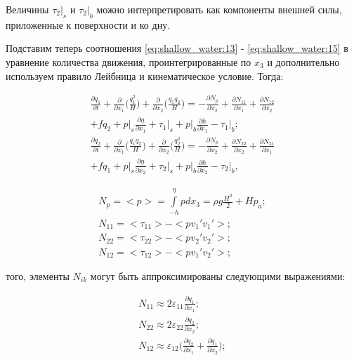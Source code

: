 \documentclass[14pt]{extreport}
\begin{document}
Величины $\tau_2|_s$ и $\tau_2|_b$ можно интерпретировать как компоненты внешней силы, приложенные к поверхности и ко дну.

Подставим теперь соотношения \ref{eq:shallow_water:13} - \ref{eq:shallow_water:15} в уравнение количества движения, проинтегрированные по $x_3$ и дополнительно используем правило Лейбница и кинематическое условие. Тогда:

\begin{equation}\label{eq:shallow_water:17}
\begin{aligned}
\frac{\partial q_1}{\partial t} + \frac{\partial}{\partial x_1} \bigg(\frac{q_1^2}{H}\bigg)+\frac{\partial }{\partial x_2}\bigg(\frac{q_1 q_2}{H}\bigg) = -\frac{\partial N_p}{\partial x_2} + \frac{\partial N_{11}}{\partial x_1} + \frac{\partial N_{12}}{\partial x_2} \\+ fq_2 + p\bigg|_s \frac{\partial \eta}{\partial x_1} + \tau_1\bigg|_s+p\bigg|_b\frac{\partial h}{\partial x_1} - \tau_1\bigg|_b; \\
\frac{\partial q_2}{\partial t} + \frac{\partial}{\partial x_1} \bigg(\frac{q_1 q_2}{H}\bigg)+\frac{\partial }{\partial x_2}\bigg(\frac{q_2^2}{H}\bigg) = -\frac{\partial N_p}{\partial x_2} + \frac{\partial N_{22}}{\partial x_2} + \frac{\partial N_{21}}{\partial x_1} \\+ fq_1 + p\bigg|_s \frac{\partial \eta}{\partial x_2} + \tau_2\bigg|_s+p\bigg|_b\frac{\partial h}{\partial x_2} - \tau_2\bigg|_b,
\end{aligned}
\end{equation}


\begin{equation}\label{eq:shallow_water:18}
\begin{aligned}
N_p = <p> = \int\limits^\eta_{-h} pdx_3=\rho g \frac{H^2}{2} + Hp_a; \\
N_{11} = <\tau_{11}>-<pv_1'v_1'>; \\
N_{22} = <\tau_{22}>-<pv_2'v_2'>; \\
N_{12} = <\tau_{12}>-<pv_1'v_2'>;
\end{aligned}
\end{equation}

 того, элементы $N_{ik}$ могут быть аппроксимированы следующими выражениями:

\begin{equation}\label{eq:shallow_water:19}
\begin{aligned}
N_{11} \approx 2 \varepsilon_{11}\frac{\partial q_1}{\partial x_1}; \\
N_{22} \approx 2 \varepsilon_{22}\frac{\partial q_2}{\partial x_2}; \\
N_{12} \approx \varepsilon_{12}\bigg(\frac{\partial q_2}{\partial x_1}+\frac{\partial q_1}{\partial x_2}\bigg);
\end{aligned}
\end{equation}
\end{document}
